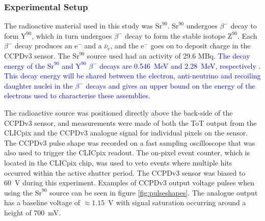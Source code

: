 \subsubsection{Experimental Setup}
The radioactive material used in this study was $\text{Sr}^{90}$.  $\text{Sr}^{90}$ undergoes $\beta^{-}$ decay to form $\text{Y}^{90}$, which in turn undergoes $\beta^{-}$ decay to form the stable isotope $\text{Z}^{90}$.  Each $\beta^{-}$ decay produces an $\text{e}^{-}$ and a $\bar{\nu}_{\text{e}}$, and the $\text{e}^{-}$ goes on to deposit charge in the CCPDv3 sensor.  The $\text{Sr}^{90}$ source used had an activity of 29.6 MBq.  \textcolor{blue}{The decay energy of the $\text{Sr}^{90}$ and $\text{Y}^{90}$ $\beta^{-}$ decays are 0.546~MeV and 2.28~MeV, respectively \cite{radiationhandbook}.  This decay energy will be shared between the electron, anti-neutrino and recoiling daughter nuclei in the $\beta^{-}$ decays and gives an upper bound on the energy of the electrons used to characterise these assemblies.}

The radioactive source was positioned directly above the back-side of the CCPDv3 sensor, and measurements were made of both the ToT output from the CLICpix and the CCPDv3 analogue signal for individual pixels on the sensor.  The CCPDv3 pulse shape was recorded on a fast sampling oscilloscope that was also used to trigger the CLICpix readout.  The on-pixel event counter, which is located in the CLICpix chip, was used to veto events where multiple hits occurred within the active shutter period.  The CCPDv3 sensor was biased to 60~V during this experiment.  Examples of CCPDv3 output voltage pulses when using the $\text{Sr}^{90}$ source can be seen in figure \ref{fig:pulseshapes}.  The analogue output has a baseline voltage of $\approx 1.15$~V with signal saturation occurring around a height of 700~mV.  


